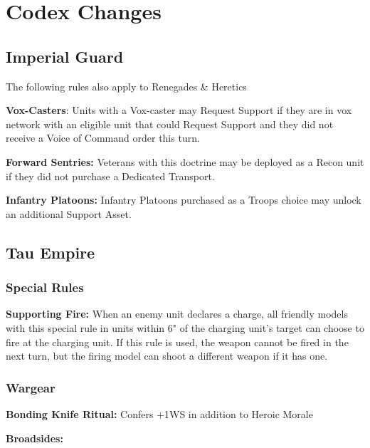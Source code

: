 \documentclass[letterpaper,twocolumn,oneside,titlepage]{book}
\begin{document}
\chapter{\texorpdfstring{\textbf{Codex
Changes}}{Codex Changes}}\label{codex-changes}

\section{\texorpdfstring{\textbf{Imperial
Guard}}{Imperial Guard}}\label{imperial-guard}

The following rules also apply to Renegades \& Heretics

\textbf{Vox-Casters}: Units with a Vox-caster may Request Support if
they are in vox network with an eligible unit that could Request Support
and they did not receive a Voice of Command order this turn.

\textbf{Forward Sentries:} Veterans with this doctrine may be deployed as
a Recon unit if they did not purchase a Dedicated Transport.

\textbf{Infantry Platoons:} Infantry Platoons purchased as a Troops choice may unlock an additional
Support Asset.

\section{\texorpdfstring{\textbf{Tau Empire}}{Tau Empire}}\label{tau-empire}

\subsection{\texorpdfstring{\textbf{Special
Rules}}{Special Rules}}\label{special-rules}
\textbf{Supporting Fire:} When an enemy unit declares a charge, all friendly models with this special rule in units within 6" of the charging unit’s target can choose to fire at the charging unit.
If this rule is used, the weapon cannot be fired in the next turn, but the firing model can shoot a different weapon if it has one.

\subsection{\texorpdfstring{\textbf{Wargear}}{Wargear}}\label{unit-changes}

\textbf{Bonding Knife Ritual:} Confers +1WS in addition to Heroic Morale

\textbf{Broadsides:}
\end{document}
